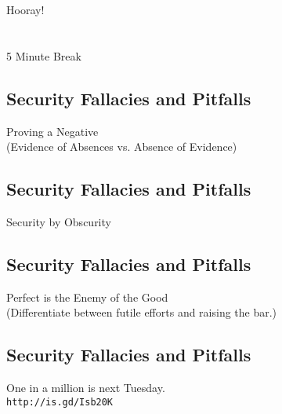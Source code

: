 \documentclass[xga]{xdvislides}
\begin{document}
\newpage
\vspace*{\fill}
\begin{center}
    \Hugesize
        Hooray! \\ [1em]
    \hspace*{5mm}
    \blueline\\
    \hspace*{5mm}\\
        5 Minute Break
\end{center}
\vspace*{\fill}

\subsection{Security Fallacies and Pitfalls}
\vspace*{\fill}
\begin{center}
    \Hugesize
        Proving a Negative \\
	\vspace{.25in}
	\Normalsize
	(Evidence of Absences vs. Absence of Evidence)
\end{center}
\vspace*{\fill}


\subsection{Security Fallacies and Pitfalls}
\vspace*{\fill}
\begin{center}
    \Hugesize
        Security by Obscurity
\end{center}
\vspace*{\fill}

\subsection{Security Fallacies and Pitfalls}
\vspace*{\fill}
\begin{center}
    \Hugesize
        Perfect is the Enemy of the Good \\
	\vspace{.25in}
	\Normalsize
	(Differentiate between futile efforts and raising the bar.)
\end{center}
\vspace*{\fill}

\subsection{Security Fallacies and Pitfalls}
\vspace*{\fill}
\begin{center}
    \Hugesize
        One in a million is next Tuesday. \\
	\vspace{.25in}
	\Normalsize
	\verb+http://is.gd/Isb20K+
\end{center}
\vspace*{\fill}
\end{document}
